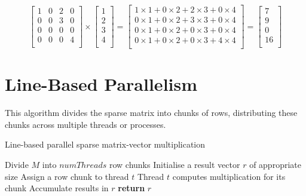 \documentclass[12pt,oneside]{book} %
\begin{document}
\[
    \begin{bmatrix}
        1 & 0 & 2 & 0 \\
        0 & 0 & 3 & 0 \\
        0 & 0 & 0 & 0 \\
        0 & 0 & 0 & 4 \\
    \end{bmatrix}
    \times
    \begin{bmatrix}
        1 \\
        2 \\
        3 \\
        4 \\
    \end{bmatrix}
    =
    \begin{bmatrix}
        1 \times 1 + 0 \times 2 + 2 \times 3 + 0 \times 4 \\
        0 \times 1 + 0 \times 2 + 3 \times 3 + 0 \times 4 \\
        0 \times 1 + 0 \times 2 + 0 \times 3 + 0 \times 4 \\
        0 \times 1 + 0 \times 2 + 0 \times 3 + 4 \times 4 \\
    \end{bmatrix}
    =
    \begin{bmatrix}
        7  \\
        9  \\
        0  \\
        16 \\
    \end{bmatrix}
\]

\section{Line-Based Parallelism}
This algorithm divides the sparse matrix into chunks of rows, distributing
these chunks across multiple threads or processes.

\begin{algorithm}[H]
    \caption{Line-based parallel sparse matrix-vector multiplication}
    \begin{algorithmic}[1]
        \State Divide $M$ into $numThreads$ row chunks
        \State Initialise a result vector $r$ of appropriate size
        \State Assign a row chunk to thread $t$
        \State Thread $t$ computes multiplication for its chunk
        \State Accumulate results in $r$
        \EndFor
        \State \textbf{return} $r$
        \EndProcedure
    \end{algorithmic}
\end{algorithm}
\end{document}
